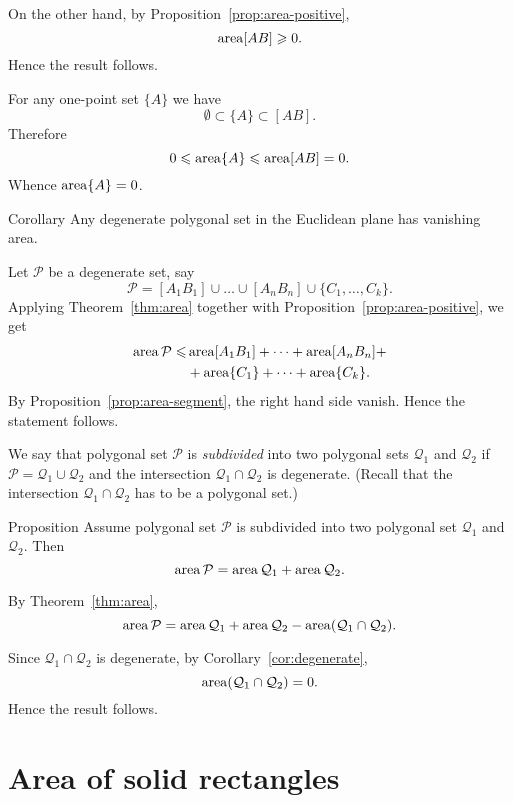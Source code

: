 On the other hand, by Proposition~\ref{prop:area-positive},
\[\mathop{\rm area}\nolimits[AB]\geqslant 0.\]
Hence the result follows.

For any one-point set $\{A\}$ 
we have 
\[\emptyset\subset \{A\}\subset [AB].\]
Therefore 
\[0\leqslant \mathop{\rm area}\nolimits\{A\}\leqslant \mathop{\rm area}\nolimits[AB]=0.\]
Whence $\mathop{\rm area}\nolimits\{A\}=0$.
\qeds

\begin{thm}{Corollary}\label{cor:degenerate}
Any degenerate polygonal set in the Euclidean plane has vanishing area.
\end{thm}

Let $\mathcal P$ be a degenerate set,
say
\[\mathcal{P}=[A_1B_1]\cup\dots\cup[A_nB_n]\cup\{C_1,\dots,C_k\}.\]
Applying Theorem~\ref{thm:area} 
together with Proposition~\ref{prop:area-positive},
we get
\begin{align*}
\mathop{\rm area}\nolimits\mathcal{P}\leqslant
& \mathop{\rm area}\nolimits[A_1B_1]+\dots+\mathop{\rm area}\nolimits[A_nB_n]+
\\
&+\mathop{\rm area}\nolimits\{C_1\}+\dots+\mathop{\rm area}\nolimits\{C_k\}.
\end{align*}
By Proposition~\ref{prop:area-segment}, the right hand side vanish.
Hence the statement follows.
\qeds


We say that polygonal set $\mathcal{P}$ is \emph{subdivided} 
into two polygonal sets $\mathcal{Q}_1$ and $\mathcal{Q}_2$ 
if $\mathcal{P}=\mathcal{Q}_1\cup\mathcal{Q}_2$ 
and the intersection $\mathcal{Q}_1\cap\mathcal{Q}_2$ is degenerate.
(Recall that the intersection $\mathcal{Q}_1\cap\mathcal{Q}_2$ has to be a polygonal set.)

\begin{thm}{Proposition}\label{prop:subdivision}
Assume polygonal set $\mathcal{P}$ is subdivided into two polygonal set $\mathcal{Q}_1$ and $\mathcal{Q}_2$.
Then 
\[\mathop{\rm area}\nolimits\mathcal{P}=\mathop{\rm area}\nolimits\mathcal{Q}_1+\mathop{\rm area}\nolimits\mathcal{Q}_2.\]

\end{thm}

By Theorem~\ref{thm:area},
\[\mathop{\rm area}\nolimits\mathcal{P}=\mathop{\rm area}\nolimits\mathcal{Q}_1+\mathop{\rm area}\nolimits\mathcal{Q}_2-\mathop{\rm area}\nolimits(\mathcal{Q}_1\cap\mathcal{Q}_2).\]

Since $\mathcal{Q}_1\cap\mathcal{Q}_2$ is degenerate,
by Corollary~\ref{cor:degenerate},
\[\mathop{\rm area}\nolimits(\mathcal{Q}_1\cap\mathcal{Q}_2)=0.\]
Hence the result follows.
\qeds


\section*{Area of solid rectangles}

